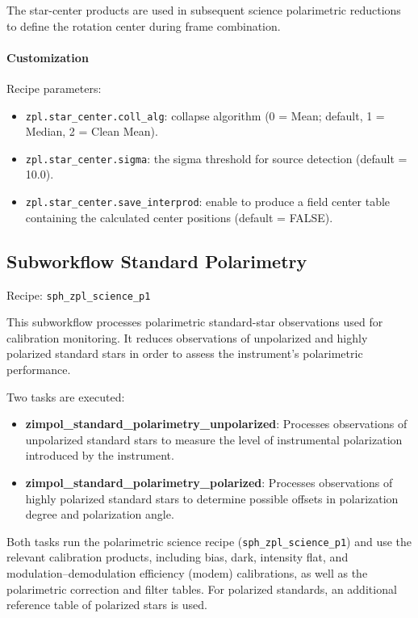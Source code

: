 The star-center products are used in subsequent science polarimetric reductions
to define the rotation center during frame combination.

\paragraph{Customization}

Recipe parameters:
\begin{itemize}
\item \texttt{zpl.star\_center.coll\_alg}: collapse algorithm
(0 = Mean; default, 1 = Median, 2 = Clean Mean).
\item \texttt{zpl.star\_center.sigma}: the sigma threshold for source detection
(default = 10.0).
\item \texttt{zpl.star\_center.save\_interprod}: enable to produce
a field center table containing the calculated center positions
(default = FALSE).
\end{itemize}




\subsection{Subworkflow Standard Polarimetry}

Recipe: \texttt{sph\_zpl\_science\_p1}

This subworkflow processes polarimetric standard-star observations used for calibration monitoring.
It reduces observations of unpolarized and highly polarized standard stars in order to assess
the instrument's polarimetric performance.

Two tasks are executed:

\begin{itemize}
\item \textbf{zimpol\_standard\_polarimetry\_unpolarized}: Processes observations of unpolarized standard stars
to measure the level of instrumental polarization introduced by the instrument.
\item \textbf{zimpol\_standard\_polarimetry\_polarized}: Processes observations of highly polarized standard stars
to determine possible offsets in polarization degree and polarization angle.
\end{itemize}

Both tasks run the polarimetric science recipe (\texttt{sph\_zpl\_science\_p1}) and use the relevant calibration products,
including bias, dark, intensity flat, and modulation--demodulation efficiency (modem) calibrations,
as well as the polarimetric correction and filter tables. For polarized standards,
an additional reference table of polarized stars is used.

